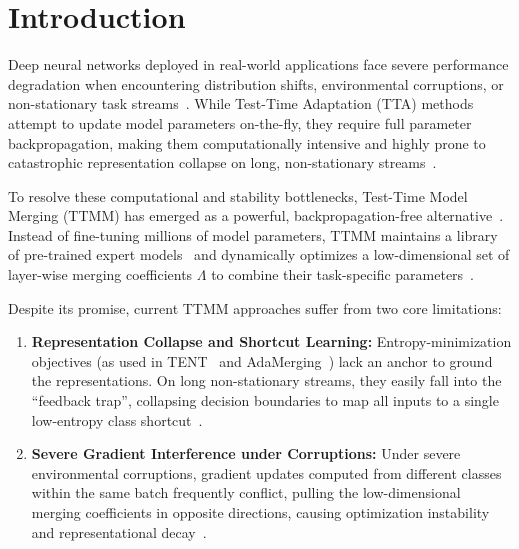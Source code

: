 \documentclass{article}
\theoremstyle{plain}
\theoremstyle{definition}
\theoremstyle{remark}
\begin{document}
\section{Introduction}
\label{sec:intro}
Deep neural networks deployed in real-world applications face severe performance degradation when encountering distribution shifts, environmental corruptions, or non-stationary task streams~\cite{resnet, imagenet}. While Test-Time Adaptation (TTA) methods~\cite{tent, cotta} attempt to update model parameters on-the-fly, they require full parameter backpropagation, making them computationally intensive and highly prone to catastrophic representation collapse on long, non-stationary streams~\cite{note, rotta}.

To resolve these computational and stability bottlenecks, Test-Time Model Merging (TTMM) has emerged as a powerful, backpropagation-free alternative~\cite{adamerging, soups}. Instead of fine-tuning millions of model parameters, TTMM maintains a library of pre-trained expert models~\cite{task_arithmetic} and dynamically optimizes a low-dimensional set of layer-wise merging coefficients $\Lambda$ to combine their task-specific parameters~\cite{ties_merging, dare}.

Despite its promise, current TTMM approaches suffer from two core limitations:
\begin{enumerate}
    \item \textbf{Representation Collapse and Shortcut Learning:} Entropy-minimization objectives (as used in TENT~\cite{tent} and AdaMerging~\cite{adamerging}) lack an anchor to ground the representations. On long non-stationary streams, they easily fall into the ``feedback trap'', collapsing decision boundaries to map all inputs to a single low-entropy class shortcut~\cite{note, eata}.
    \item \textbf{Severe Gradient Interference under Corruptions:} Under severe environmental corruptions, gradient updates computed from different classes within the same batch frequently conflict, pulling the low-dimensional merging coefficients in opposite directions, causing optimization instability and representational decay~\cite{pcgrad, cagrad}.
\end{enumerate}
\end{document}
